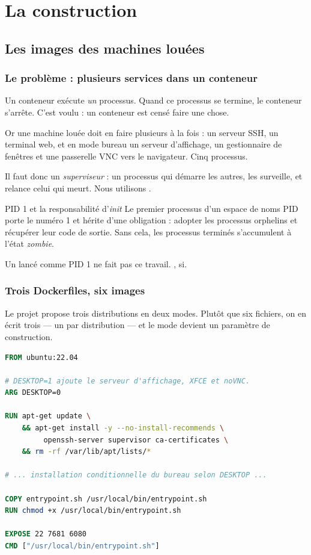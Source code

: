 \part{La construction}
\label{part:construction}

\chapter{Les images des machines louées}
\label{chap:images}

\section{Le problème : plusieurs services dans un conteneur}

Un conteneur exécute \emph{un} processus. Quand ce processus se termine, le
conteneur s'arrête. C'est voulu : un conteneur est censé faire une chose.

Or une machine louée doit en faire plusieurs à la fois : un serveur SSH, un
terminal web, et en mode bureau un serveur d'affichage, un gestionnaire de
fenêtres et une passerelle VNC vers le navigateur. Cinq processus.

Il faut donc un \emph{superviseur} : un processus qui démarre les autres, les
surveille, et relance celui qui meurt. Nous utilisons .

\begin{notion}{PID 1 et la responsabilité d'\emph{init}}
Le premier processus d'un espace de noms PID porte le numéro 1 et hérite d'une
obligation : adopter les processus orphelins et récupérer leur code de sortie.
Sans cela, les processus terminés s'accumulent à l'état \emph{zombie}.

Un  lancé comme PID 1 ne fait pas ce travail. , si.
\end{notion}

\section{Trois Dockerfiles, six images}

Le projet propose trois distributions en deux modes. Plutôt que six fichiers,
on en écrit trois --- un par distribution --- et le mode devient un paramètre
de construction.

\begin{lstlisting}[language=dockerfile,caption={\fichier{1\_docker/Dockerfile} --- la structure (extraits)}]
FROM ubuntu:22.04

# DESKTOP=1 ajoute le serveur d'affichage, XFCE et noVNC.
ARG DESKTOP=0

RUN apt-get update \
    && apt-get install -y --no-install-recommends \
         openssh-server supervisor ca-certificates \
    && rm -rf /var/lib/apt/lists/*

# ... installation conditionnelle du bureau selon DESKTOP ...

COPY entrypoint.sh /usr/local/bin/entrypoint.sh
RUN chmod +x /usr/local/bin/entrypoint.sh

EXPOSE 22 7681 6080
CMD ["/usr/local/bin/entrypoint.sh"]
\end{lstlisting}

